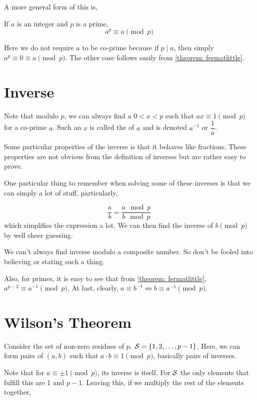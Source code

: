 A more general form of this is, 

\begin{theorem}
    \label{theorem: fermatlittle2}
    If \(a\) is an integer and \(p\) is a prime, 
    \[a^{p} \equiv a \pmod{p}\]
\end{theorem}

Here we do not require \(a\) to be co-prime because if \(p \mid a\), then
simply \(a^p \equiv 0 \equiv a \pmod{p}\). The other case
follows easily from \cref{theorem: fermatlittle}.

\section{Inverse}

Note that modulo \(p\), we can always find a \(0 < x < p\) such that 
\(ax \equiv 1 \pmod{p}\) for a co-prime \(a\). Such 
an \(x\) is called the  of \(a\) and is denoted \(a^{-1}\) or \(\dfrac{1}{a}\).

Some particular properties of the inverse is that it behaves like fractions.
These properties are not obvious from the definition of inverses but are rather easy to prove.

One particular thing to remember when solving some of these inverses is that
we can simply a lot of stuff, particularly,

\[\frac{a}{b} = \frac{a \mod{p}}{b \mod{p}}\] which simplifies the expression a lot.
We can then find the inverse of \(b \pmod{p}\) by well sheer guessing.

We can't always find inverse modulo a composite number. So don't be fooled into believing or stating
such a thing.

Also, for primes, it is easy to see that from \cref{theorem: fermatlittle}, \(a^{p-2} \equiv a^{-1} \pmod{p}\).
At last, clearly, \(a \equiv b^{-1} \iff b \equiv a^{-1} \pmod{p}\). 

\section{Wilson's Theorem}

Consider the set of non-zero residues of \(p\), \(\mathcal{S} = \left\{1, 2, \dots, p-1\right\}\).
Here, we can form pairs of \((a,b)\) such that \(a \cdot b \equiv 1 \pmod{p}\), 
basically pairs of inverses.

Note that for \(a \equiv \pm 1 \pmod{p}\), its inverse is itself.
For \(\mathcal{S}\) the only elements that fulfill this are \(1\) and \(p-1\).
Leaving this, if we multiply the rest of the elements together, 

